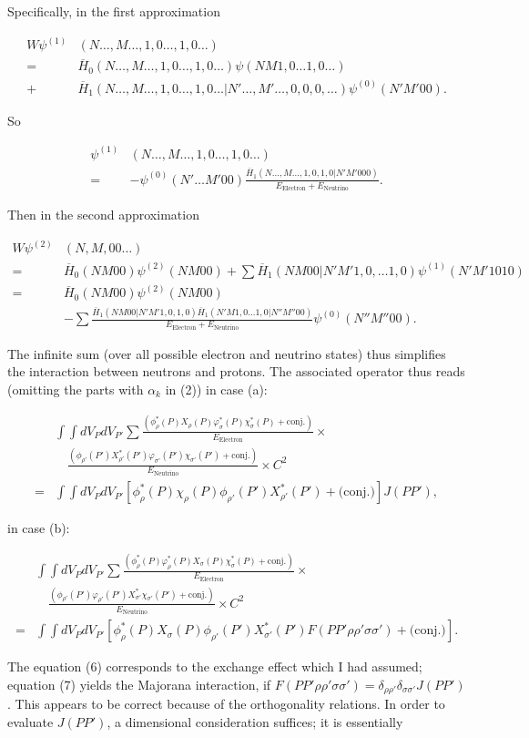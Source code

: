 \documentclass{article}
\newcommand{\nf}[2]{
\newcommand{#1}[1]{#2}
}
\newcommand{\nc}[2]{
  \newcommand{#1}{#2}
}
\newcommand{\nequ}[2]{
\begin{align*}
#1
\tag{#2}
\end{align*}
}
\newcommand{\uequ}[1]{
\begin{align*}
#1
\end{align*}
}
\begin{document}
Specifically, in the first approximation
\uequ{
W\psi^{(1)}&(N\dots,M\dots,1,0\dots,1,0\dots)\\
= &\overline{H}_0(N\dots,M\dots,1,0\dots,1,0\dots)\psi(N M 1,0\dots 1,0\dots)\\
+ &\overline{H}_1(N\dots,M\dots,1,0\dots,1,0\dots|N'\dots, M'\dots,0,0,0,\dots)\psi^{(0)}(N'M'0 0).
}
So
\nequ{
\psi^{(1)}&(N\dots,M\dots,1,0\dots,1,0\dots)\\
 = &-\psi^{(0)}(N'\dots M' 0 0)
    \frac{\overline{H}_1(N\dots,M\dots,1,0,1,0|N'M'0 0 0)}{E_\text{Electron} + E_\text{Neutrino}}.
}{4}
Then in the second approximation
\nequ{
W\psi^{(2)}&(N,M,0 0\dots)\\
 = & \overline{H}_0(N M 0 0)\psi^{(2)}(N M 0 0) + 
 \sum\overline{H}_1(N M 0 0|N'M'1,0,\dots 1,0)\psi^{(1)}(N'M'1 0 1 0)\\
 = & \overline{H}_0(N M 0 0)\psi^{(2)}(N M 0 0)\\
   & - \sum\frac{
     \overline{H}_1(N M 0 0|N'M' 1,0,1,0)
     \overline{H}_1(N'M 1,0\dots 1,0|N'' M'' 0 0)
   }{E_\text{Electron} + E_\text{Neutrino}}
   \psi^{(0)}(N''M'' 0 0).
}{5}
The infinite sum (over all possible electron and neutrino states) thus simplifies the interaction between neutrons and protons. The associated operator thus reads (omitting the parts with $\alpha_k$ in (2)) in case (a):
\nequ{
&\int\int {dV_P}{dV_{P'}}
\sum\frac{
\left(\phi^*_\rho(P) X_\rho(P) \varphi^*_\sigma(P) \chi^*_\sigma(P) + \text{conj.}\right)
}{E_\text{Electron}}\times\\
&\quad\frac{
\left(\phi_{\rho'}(P') X^*_{\rho'}(P') \varphi_{\sigma'}(P') \chi_{\sigma'}(P') + \text{conj.}\right)
}{E_\text{Neutrino}}\times C^2\\
= & \int\int{dV_P}{dV_{P'}}\left[
  \phi^*_\rho(P) \chi_\rho(P) \phi_{\rho'}(P') X^*_{\rho'}(P') + \text{(conj.)}
\right]J(P P'),
}{6}
in case (b):
\nequ{
&\int\int {dV_P}{dV_{P'}}
\sum\frac{
\left(\phi^*_\rho(P) \varphi^*_\rho(P) X_\sigma(P) \chi^*_\sigma(P) + \text{conj.}\right)
}{E_\text{Electron}}\times\\
&\quad\frac{
\left(\phi_{\rho'}(P') \varphi_{\rho'}(P') X^*_{\sigma'} \chi_{\sigma'}(P') + \text{conj.}\right)
}{E_\text{Neutrino}}\times C^2\\
= & \int\int{dV_P}{dV_{P'}}\left[
  \phi^*_\rho(P) X_\sigma(P) \phi_{\rho'}(P') X^*_{\sigma'}(P')F(P P' \rho \rho' \sigma \sigma') + \text{(conj.)}
\right].
}{7}
The equation (6) corresponds to the exchange effect which I had assumed; equation (7) yields the Majorana interaction, if $F(P P' \rho\rho' \sigma\sigma') = \delta_{\rho\rho'}\delta_{\sigma\sigma'}J(P P')$. This appears to be correct because of the orthogonality relations. In order to evaluate $J(P P')$, a dimensional consideration suffices; it is essentially
\nf{\MF}{\mathfrak{#1}}
\nc{\fp}{\MF{p}}
\nc{\fr}{\MF{r}}
\end{document}
